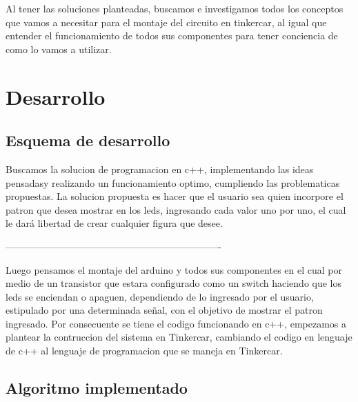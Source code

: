 \documentclass{article}
\begin{document}
Al tener las soluciones planteadas, buscamos e investigamos todos los conceptos que vamos a necesitar para el montaje del circuito en tinkercar, al igual que entender el funcionamiento de todos sus componentes para tener conciencia de como lo vamos a utilizar.






\vspace{14cm}

\section{Desarrollo} \label{contenido}
\subsection{Esquema de desarrollo}

Buscamos la solucion de programacion en c++, implementando las ideas pensadasy realizando un funcionamiento optimo, cumpliendo las problematicas propuestas.
 \vspace{1cm}
La solucion propuesta es hacer que el usuario sea quien incorpore el patron que desea mostrar en los leds, ingresando cada valor uno por uno, el cual le dará libertad de crear cualquier figura que desee.


\space

 -------------------------------------------------------------------


Luego pensamos el montaje del arduino y todos sus componentes en el cual por medio de un transistor que estara configurado como un switch haciendo que los leds se enciendan o apaguen, dependiendo de lo ingresado por el usuario, estipulado por una determinada señal, con el objetivo de mostrar el patron ingresado.
 \vspace{1cm}
Por consecuente se tiene el codigo funcionando en c++, empezamos a plantear la contruccion del sistema en Tinkercar, cambiando el codigo en lenguaje de c++ al lenguaje de programacion que se maneja en Tinkercar.



 
  \vspace{5cm}
 






\vspace{8cm}

\subsection{Algoritmo implementado}
\end{document}
